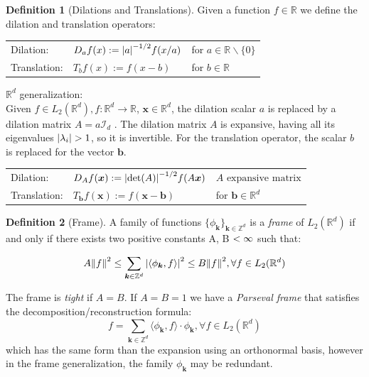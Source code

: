 \documentclass{InsightArticle}
\theoremstyle{definition}
\newtheorem{definition}{Definition}[section]
\begin{document}
\begin{definition}[Dilations and Translations]\label{def:D_T}
  Given a function $f\in\mathbb{R}$ we define the dilation and translation operators\cite{heil_continuous_1989}:\par
  \begin{tabular}{lll}
    Dilation:&  $D_a f(x):=\abs{a}^{-1/2}f(x/a)$ &for $a \in \mathbb{R}\backslash\{0\}$ \\
    Translation:&   $T_b f(x):=f(x-b)$ &for $b \in \mathbb{R}$ \\
  \end{tabular}

  $\mathbb{R}^d$ generalization:\\
  Given $f \in L_2(\mathbb{R}^d), f:\mathbb{R}^d \rightarrow \mathbb{R}$, $\bm{x}\in\mathbb{R}^d$, the dilation scalar $a$ is replaced by a dilation matrix $A = a \mathcal{I}_d$ \cite{qian_wavelet_2007}. The dilation matrix $A$ is expansive, having all its eigenvalues $\abs{\lambda_i} > 1$, so it is invertible. For the translation operator, the scalar $b$ is replaced for the vector $\bm{b}$.\par
  \begin{tabular}{lll}
    Dilation:& $D_A f(\bm{x}):=\abs{\det(A)}^{-1/2}f(A\bm{x})$ &$A \text{ expansive matrix}$\\
    Translation:&   $T_{\bm{b}} f(\bm{x}):=f(\bm{x}-\bm{b})$ &for $\bm{b} \in \mathbb{R}^d$ \\
  \end{tabular}
\end{definition}

\begin{definition}[Frame]\label{def:frame}
    A family of functions $\{\phi_{\bm{k}}\}_{ \bm{k}\in\mathbb{Z}^d}$ is a \textit{frame} of $L_2(\mathbb{R}^d)$ if and only if there exists two positive constants A, B $< \infty$ such that:

\begin{equation}
  A\norm{f}^2 \le \sum_{\bm{k}\in\mathbb{Z}^d}\abs{\langle\phi_{\bm{k}},f\rangle}^2 \le B\norm{f}^2, \forall f \in L_2(\mathbb{R}^d)
\end{equation}

The frame is \textit{tight} if $A=B$. If $A=B=1$ we have a \textit{Parseval frame} that satisfies the decomposition/reconstruction formula:
\begin{equation}
  f = \sum_{\bm{k}\in\mathbb{Z}^d}\langle\phi_{\bm{k}},f\rangle \cdot \phi_{\bm{k}}, \forall f \in L_2(\mathbb{R}^d)
\end{equation}
which has the same form than the expansion using an orthonormal basis, however in the frame generalization, the family $\phi_{\bm{k}}$ may be redundant.
\end{definition}
\end{document}
